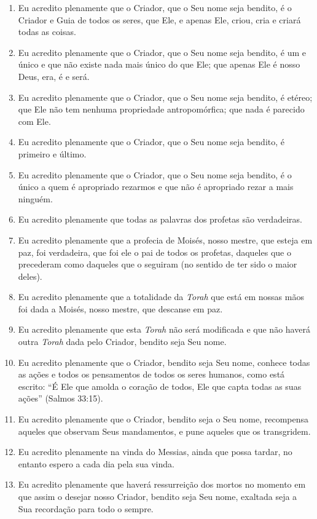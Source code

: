 \begin{enumerate}
\def\labelenumi{\arabic{enumi}.}
\item
  Eu acredito plenamente que o Criador, que o Seu nome seja bendito, é o
  Criador e Guia de todos os seres, que Ele, e apenas Ele, criou, cria e
  criará todas as coisas.

\item
  Eu acredito plenamente que o Criador, que o Seu nome seja bendito, é
  um e único e que não existe nada mais único do que Ele; que apenas Ele
  é nosso Deus, era, é e será.

\item
  Eu acredito plenamente que o Criador, que o Seu nome seja bendito, é
  etéreo; que Ele não tem nenhuma propriedade antropomórfica; que nada
  é parecido com Ele.

\item
  Eu acredito plenamente que o Criador, que o Seu nome seja bendito, é
  primeiro e último.

\item
  Eu acredito plenamente que o Criador, que o Seu nome seja bendito, é o
  único a quem é apropriado rezarmos e que não é apropriado rezar a mais
  ninguém.

\item
  Eu acredito plenamente que todas as palavras dos profetas são
  verdadeiras.

\item
  Eu acredito plenamente que a profecia de Moisés, nosso mestre, que
  esteja em paz, foi verdadeira, que foi ele o pai de todos os profetas,
  daqueles que o precederam como daqueles que o seguiram (no sentido de
  ter sido o maior deles).

\item
  Eu acredito plenamente que a totalidade da \emph{Torah} que está em
  nossas mãos foi dada a Moisés, nosso mestre, que descanse em paz.

\item
  Eu acredito plenamente que esta \emph{Torah} não será modificada e que
  não haverá outra \emph{Torah} dada pelo Criador, bendito seja Seu
  nome.

\item
  Eu acredito plenamente que o Criador, bendito seja Seu nome, conhece
  todas as ações e todos os pensamentos de todos os seres humanos, como
  está escrito: ``É Ele que amolda o coração de todos, Ele que capta
  todas as suas ações'' (Salmos 33:15).

\item
  Eu acredito plenamente que o Criador, bendito seja o Seu nome,
  recompensa aqueles que observam Seus mandamentos, e pune aqueles que
  os transgridem.

\item
  Eu acredito plenamente na vinda do Messias, ainda que possa tardar, no
  entanto espero a cada dia pela sua vinda.

\item
  Eu acredito plenamente que haverá ressurreição dos mortos no momento
  em que assim o desejar nosso Criador, bendito seja Seu nome, exaltada
  seja a Sua recordação para todo o sempre.
\end{enumerate}

